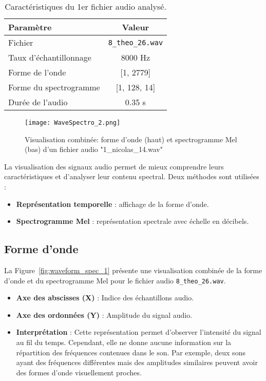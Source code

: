 \documentclass[11pt,a4paper]{article}
\begin{document}
\begin{table}[h]
    \centering
    \begin{tabular}{|l|c|}
        \hline
        \textbf{Paramètre} & \textbf{Valeur} \\
        \hline
        Fichier & \texttt{8\_theo\_26.wav} \\
        Taux d’échantillonnage & 8000 Hz \\
        Forme de l’onde & [1, 2779] \\
        Forme du spectrogramme & [1, 128, 14] \\
        Durée de l’audio & 0.35 s \\
        \hline
    \end{tabular}
    \caption{Caractéristiques du 1er fichier audio analysé.}
    \label{tab:audio_info}
\end{table}

\begin{figure}[H]
    \centering
    \texttt{[image: WaveSpectro\_2.png]}
    \caption{Visualisation combinée: forme d'onde (haut) et spectrogramme Mel (bas) d'un fichier audio "1\_nicolas\_14.wav"}
    \label{fig:waveform_spec}
\end{figure}

La visualisation des signaux audio permet de mieux comprendre leurs caractéristiques et d’analyser leur contenu spectral. Deux méthodes sont utilisées :

\begin{itemize}
    \item \textbf{Représentation temporelle} : affichage de la forme d’onde.
    \item \textbf{Spectrogramme Mel} : représentation spectrale avec échelle en décibels.
\end{itemize}

\subsection{Forme d’onde}

La Figure~\ref{fig:waveform_spec_1} présente une visualisation combinée de la forme d’onde et du spectrogramme Mel pour le fichier audio \texttt{8\_theo\_26.wav}.

\begin{itemize}
    \item \textbf{Axe des abscisses (X)} : Indice des échantillons audio.
    \item \textbf{Axe des ordonnées (Y)} : Amplitude du signal audio.
    \item \textbf{Interprétation} : Cette représentation permet d'observer l'intensité du signal au fil du temps. Cependant, elle ne donne aucune information sur la répartition des fréquences contenues dans le son. Par exemple, deux sons ayant des fréquences différentes mais des amplitudes similaires peuvent avoir des formes d’onde visuellement proches.
\end{itemize}
\end{document}
